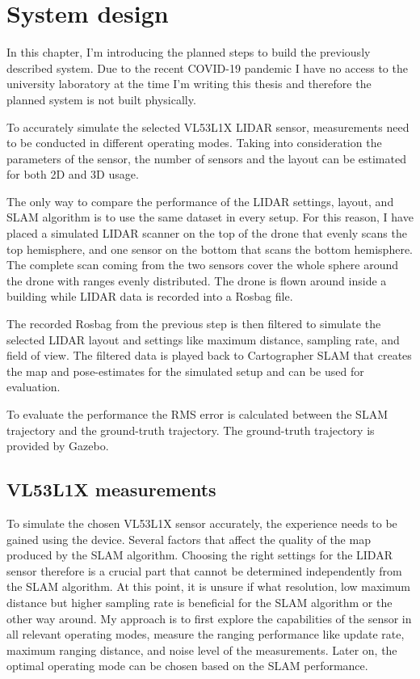 \chapter{System design} \label{chap:system_design}
In this chapter, I'm introducing the planned steps to build the previously described system. Due to the
recent COVID-19 pandemic I have no access to the university laboratory at the time I'm writing this thesis and
therefore the planned system is not built physically.

To accurately simulate the selected VL53L1X LIDAR sensor, measurements need to be conducted in different
operating modes. Taking into consideration the parameters of the sensor, the number of sensors and the layout
can be estimated for both 2D and 3D usage.

The only way to compare the performance of the LIDAR settings, layout, and SLAM algorithm is to use the same
dataset in every setup. For this reason, I have placed a simulated LIDAR scanner on the top of the drone
that evenly scans the top hemisphere, and one sensor on the bottom that scans the bottom hemisphere.
The complete scan coming from the two sensors cover the whole sphere around the drone with ranges evenly
distributed. The drone is flown around inside a building while LIDAR data is recorded into a Rosbag file.

The recorded Rosbag from the previous step is then filtered to simulate the selected LIDAR layout and settings
like maximum distance, sampling rate, and field of view. The filtered data is played back to Cartographer SLAM
that creates the map and pose-estimates for the simulated setup and can be used for evaluation.

To evaluate the performance the RMS error is calculated between the SLAM trajectory and the ground-truth
trajectory. The ground-truth trajectory is provided by Gazebo.



\section{VL53L1X measurements} \label{sect:vl53l1x_measurements}
To simulate the chosen VL53L1X sensor accurately, the experience needs to be gained using the device.
Several factors that affect the quality of the map produced by the SLAM algorithm. Choosing the right
settings for the LIDAR sensor therefore is a crucial part that cannot be determined independently from the SLAM
algorithm. At this point, it is unsure if what resolution, low maximum distance but higher sampling rate is beneficial
for the SLAM algorithm or the other way around. My approach is to first explore the capabilities of the sensor in
all relevant operating modes, measure the ranging performance like update rate, maximum ranging distance, and
noise level of the measurements. Later on, the optimal operating mode can be chosen based on the SLAM performance.

